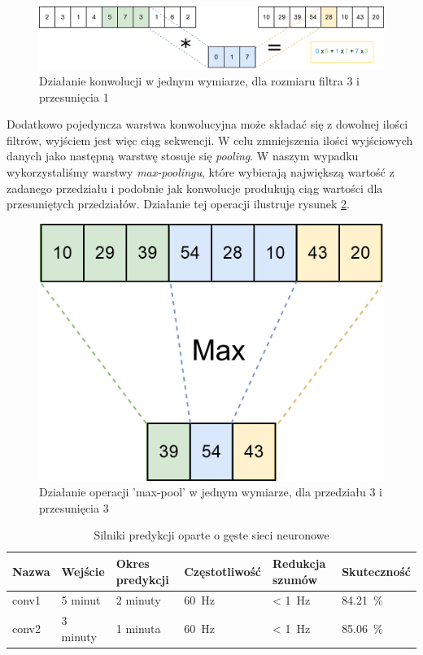 \documentclass[polish,12pt]{aghthesis}
\begin{document}
\begin{figure}[h]
	\centering
	\includegraphics[width=\linewidth]{convolution.png}
	\caption{Działanie konwolucji w jednym wymiarze, dla rozmiaru filtra 3 i przesunięcia 1}
	\label{fig:convolution}
\end{figure}

Dodatkowo pojedyncza warstwa konwolucyjna może składać się z dowolnej ilości filtrów, wyjściem jest więc ciąg sekwencji. W celu zmniejszenia ilości wyjściowych danych jako następną warstwę stosuje się \emph{pooling}.
W naszym wypadku wykorzystaliśmy warstwy \emph{max-poolingu}, które wybierają największą wartość z zadanego przedziału i podobnie jak konwolucje produkują ciąg wartości dla przesuniętych przedziałów. Działanie tej operacji ilustruje rysunek \ref{fig:max_pool}.

\begin{figure}[h]
	\centering
	\captionsetup{justification=centering}
	\includegraphics[width=0.4\linewidth]{max_pool.png}
	\caption{Działanie operacji 'max-pool' w jednym wymiarze, dla przedziału 3 i przesunięcia 3}
	\label{fig:max_pool}
\end{figure}


\begin{table}[h]
	\centering
\begin{tabular}{l|lllll}
	Nazwa & Wejście & Okres predykcji & Częstotliwość & Redukcja szumów & Skuteczność \\ \hline
	conv1 & 5 minut & 2 minuty & \SI{60}{\hertz} & < \SI{1}{\hertz} & \SI{84.21}{\percent} \\
	conv2 & 3 minuty & 1 minuta & \SI{60}{\hertz} & < \SI{1}{\hertz} & \SI{85.06}{\percent}
\end{tabular}
\caption{Silniki predykcji oparte o gęste sieci neuronowe}
\label{tab:conv_engines}
\end{table}
\end{document}
